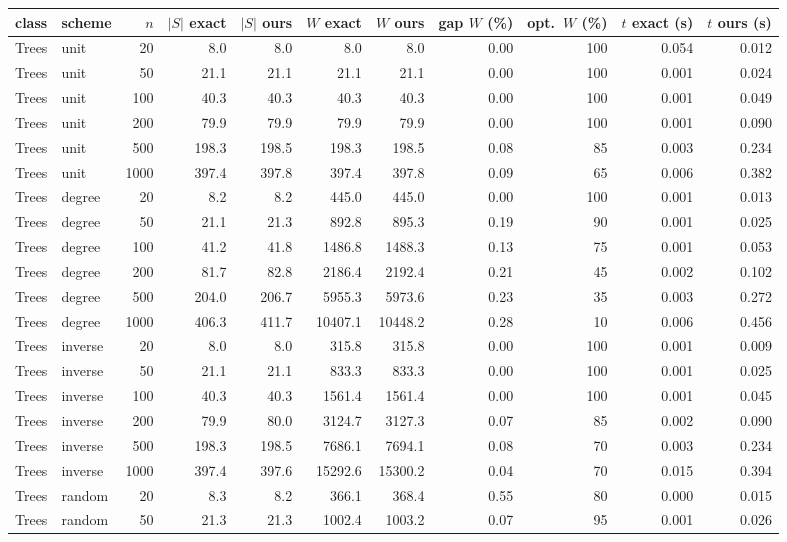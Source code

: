 \begin{tabular}{llrrrrrrrrr}
\toprule
class & scheme & $n$ & $|S|$ exact & $|S|$ ours & $W$ exact & $W$ ours & gap $W$ (\%) & opt.\ $W$ (\%) & $t$ exact (s) & $t$ ours (s) \\
\midrule
Trees & unit & 20 & 8.0 & 8.0 & 8.0 & 8.0 & 0.00 & 100 & 0.054 & 0.012 \\
Trees & unit & 50 & 21.1 & 21.1 & 21.1 & 21.1 & 0.00 & 100 & 0.001 & 0.024 \\
Trees & unit & 100 & 40.3 & 40.3 & 40.3 & 40.3 & 0.00 & 100 & 0.001 & 0.049 \\
Trees & unit & 200 & 79.9 & 79.9 & 79.9 & 79.9 & 0.00 & 100 & 0.001 & 0.090 \\
Trees & unit & 500 & 198.3 & 198.5 & 198.3 & 198.5 & 0.08 & 85 & 0.003 & 0.234 \\
Trees & unit & 1000 & 397.4 & 397.8 & 397.4 & 397.8 & 0.09 & 65 & 0.006 & 0.382 \\
Trees & degree & 20 & 8.2 & 8.2 & 445.0 & 445.0 & 0.00 & 100 & 0.001 & 0.013 \\
Trees & degree & 50 & 21.1 & 21.3 & 892.8 & 895.3 & 0.19 & 90 & 0.001 & 0.025 \\
Trees & degree & 100 & 41.2 & 41.8 & 1486.8 & 1488.3 & 0.13 & 75 & 0.001 & 0.053 \\
Trees & degree & 200 & 81.7 & 82.8 & 2186.4 & 2192.4 & 0.21 & 45 & 0.002 & 0.102 \\
Trees & degree & 500 & 204.0 & 206.7 & 5955.3 & 5973.6 & 0.23 & 35 & 0.003 & 0.272 \\
Trees & degree & 1000 & 406.3 & 411.7 & 10407.1 & 10448.2 & 0.28 & 10 & 0.006 & 0.456 \\
Trees & inverse & 20 & 8.0 & 8.0 & 315.8 & 315.8 & 0.00 & 100 & 0.001 & 0.009 \\
Trees & inverse & 50 & 21.1 & 21.1 & 833.3 & 833.3 & 0.00 & 100 & 0.001 & 0.025 \\
Trees & inverse & 100 & 40.3 & 40.3 & 1561.4 & 1561.4 & 0.00 & 100 & 0.001 & 0.045 \\
Trees & inverse & 200 & 79.9 & 80.0 & 3124.7 & 3127.3 & 0.07 & 85 & 0.002 & 0.090 \\
Trees & inverse & 500 & 198.3 & 198.5 & 7686.1 & 7694.1 & 0.08 & 70 & 0.003 & 0.234 \\
Trees & inverse & 1000 & 397.4 & 397.6 & 15292.6 & 15300.2 & 0.04 & 70 & 0.015 & 0.394 \\
Trees & random & 20 & 8.3 & 8.2 & 366.1 & 368.4 & 0.55 & 80 & 0.000 & 0.015 \\
Trees & random & 50 & 21.3 & 21.3 & 1002.4 & 1003.2 & 0.07 & 95 & 0.001 & 0.026 \\

\end{tabular}
